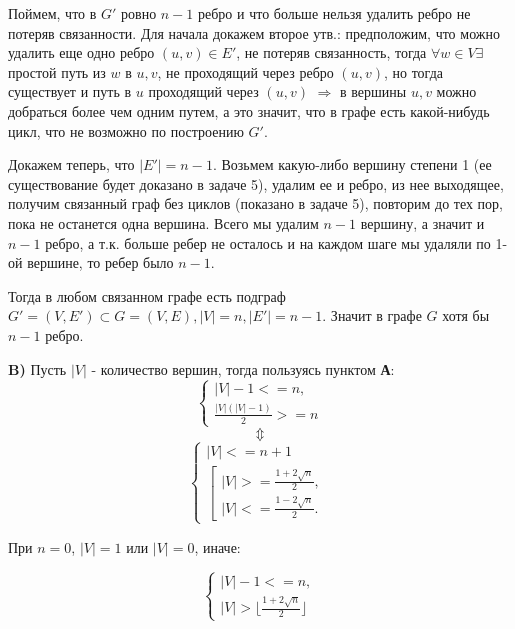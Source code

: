 \documentclass{article}
\begin{document}
 Поймем, что в $ G' $ ровно $n - 1$ ребро и что больше нельзя удалить ребро не потеряв связанности. 
 Для начала докажем второе утв.: предположим, что можно удалить еще одно ребро $(u, v) \in E'$, не потеряв связанность, тогда $ \forall w \in V \exists $ простой путь из  $w$ в $u, v$, не проходящий через ребро $(u, v)$, но тогда существует и путь в $u$ проходящий через $(u, v)$  $ \Rightarrow $ в вершины $u, v$ можно добраться более чем одним путем, а это значит, что в графе есть какой-нибудь цикл, что не возможно по построению $ G' $.
 
 Докажем теперь, что $|E'| = n - 1$.  Возьмем какую-либо вершину степени 1 (ее существование будет доказано в задаче 5), удалим ее и ребро, из нее выходящее, получим связанный граф без циклов (показано в задаче 5), повторим до тех пор, пока не останется одна вершина. Всего мы удалим $ n - 1 $ вершину, а значит и $n - 1$ ребро, а т.к. больше ребер не осталось и на каждом шаге мы удаляли по 1-ой вершине, то ребер было $ n - 1 $.  
 
 Тогда в любом связанном графе есть подграф $G'=(V, E') \subset G = (V, E), |V| = n, |E'| = n - 1$. Значит в графе $ G $ хотя бы $ n - 1$ ребро.
 
\textbf{B)} Пусть $|V|$ - количество вершин, тогда пользуясь пунктом \textbf{А}:
\begin{equation*}
	\begin{cases}
		|V| - 1 <= n, \\
		\frac{|V|(|V| - 1)}{2} >= n 
	\end{cases}
\end{equation*}
$$ \Updownarrow $$
\begin{equation*}
	\begin{cases}
		|V| <= n + 1 \\
		\left[\begin{array}{l} 
			|V| >= \frac{1 + 2\sqrt{n}}{2}, \\ 
			|V| <= \frac{1 - 2\sqrt{n}}{2}. \end{array}\right. 
	\end{cases}
\end{equation*}

При $n = 0$, $|V| = 1$ или $|V| = 0$, иначе: 

\begin{equation*}
\begin{cases}
|V| - 1 <= n, \\
|V| > \lfloor\frac{1 + 2\sqrt{n}}{2}\rfloor
\end{cases}
\end{equation*}
 
\end{document}
